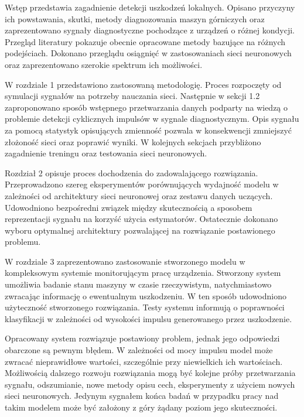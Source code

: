 \documentclass[inzynierska]{pwr_wmat_praca_dyplomowa}
\theoremstyle{plain}
\numberwithin{theorem}{chapter}
\theoremstyle{definition}
\numberwithin{theorem}{chapter}
\begin{document}
Wstęp przedstawia zagadnienie detekcji uszkodzeń lokalnych. Opisano przyczyny ich powstawania, skutki, metody diagnozowania maszyn górniczych oraz zaprezentowano sygnały diagnostyczne pochodzące z urządzeń o różnej kondycji. Przegląd literatury pokazuje obecnie opracowane metody bazujące na różnych podejściach. Dokonano przeglądu osiągnięć w zastosowaniach sieci neuronowych oraz zaprezentowano szerokie spektrum ich możliwości. 

W rozdziale 1 przedstawiono zastosowaną metodologię. Proces rozpoczęty od symulacji sygnałów na potrzeby nauczania sieci. Następnie w sekcji 1.2 zaproponowano sposób wstępnego przetwarzania danych podparty na wiedzą o problemie detekcji cyklicznych impulsów w sygnale diagnostycznym. Opis sygnału za pomocą statystyk opisujących zmienność pozwala w konsekwencji zmniejszyć złożoność sieci oraz poprawić wyniki. W kolejnych sekcjach przybliżono zagadnienie treningu oraz testowania sieci neuronowych.

Rozdział 2 opisuje proces dochodzenia do zadowalającego rozwiązania. Przeprowadzono szereg eksperymentów porównujących wydajność modelu w zależności od architektury sieci neuronowej oraz zestawu danych uczących. Udowodniono bezpośredni związek między skutecznością a sposobem reprezentacji sygnału na korzyść użycia estymatorów. Ostatecznie dokonano wyboru optymalnej architektury pozwalającej na rozwiązanie postawionego problemu. 

W rozdziale 3 zaprezentowano zastosowanie stworzonego modelu w kompleksowym systemie monitorującym pracę urządzenia. Stworzony system umożliwia badanie stanu maszyny w czasie rzeczywistym, natychmiastowo zwracając informację o ewentualnym uszkodzeniu. W ten sposób udowodniono użyteczność stworzonego rozwiązania. Testy systemu informują o poprawności klasyfikacji w zależności od wysokości impulsu generowanego przez uszkodzenie.

Opracowany system rozwiązuje postawiony problem, jednak jego odpowiedzi obarczone są pewnym błędem. W zależności od mocy impulsu model może zwracać nieprawidłowe wartości, szczególnie przy niewielkich ich wartościach. Możliwością dalszego rozwoju rozwiązania mogą być kolejne próby przetwarzania sygnału, odszumianie, nowe metody opisu cech, eksperymenty z użyciem nowych sieci neuronowych. Jedynym sygnałem końca badań w przypadku pracy nad takim modelem może być założony z góry żądany poziom jego skuteczności.  

 
\newpage
\end{document}

